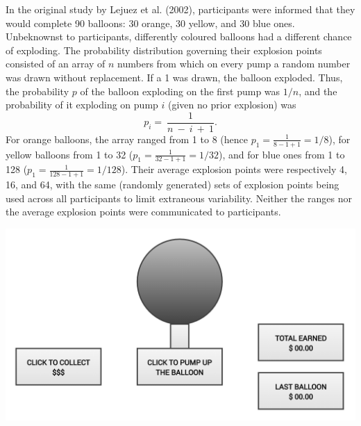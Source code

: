 \documentclass[serif, twocolumn, review]{jote-article}
\begin{document}
In the original study by Lejuez et al. (2002), participants were informed that they would complete 90 balloons: 30 orange, 30 yellow, and 30 blue ones. Unbeknownst to participants, differently coloured balloons had a different chance of exploding. The probability distribution governing their explosion points consisted of an array of $n$ numbers from which on every pump a random number was drawn without replacement. If a 1 was drawn, the balloon exploded. Thus, the probability $p$ of the balloon exploding on the first pump was $1/n$, and the probability of it exploding on pump $i$ (given no prior explosion) was
\[p_i=\ \frac{1}{n\ -\ i\ +\ 1}.\] 
For orange balloons, the array ranged from 1 to 8 (hence $p_1=\frac{1}{8-1+1}=1/8$), for yellow balloons from 1 to 32 ($p_1=\frac{1}{32-1+1}=1/32$), and for blue ones from 1 to 128 ($p_1=\frac{1}{128-1+1}=1/128$). Their average explosion points were respectively 4, 16, and 64, with the same (randomly generated) sets of explosion points being used across all participants to limit extraneous variability. Neither the ranges nor the average explosion points were communicated to participants.

\noindent\begin{minipage}{.48\textwidth}
\includegraphics[width=\textwidth]{media/Anonymised Figure_1 - BART Problems (1).png}
\label{fig:figure1}
\end{minipage}

\vspace*{1\baselineskip}
\end{document}
